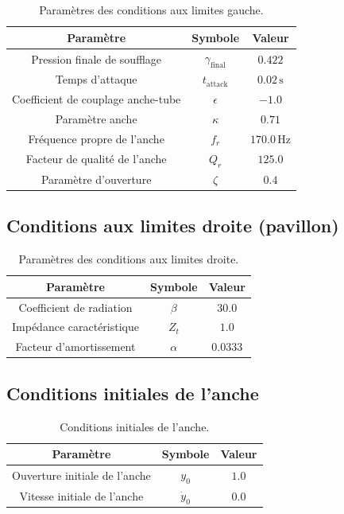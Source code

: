 \documentclass[12pt,a4paper]{article}
\begin{document}
\begin{table}[h!]
    \centering
    \begin{tabular}{|c|c|c|}
        \hline
        \textbf{Paramètre} & \textbf{Symbole} & \textbf{Valeur} \\
        \hline
        Pression finale de soufflage & $\gamma_{\text{final}}$ & $0.422$ \\
        \hline
        Temps d'attaque & $t_{\text{attack}}$ & $0.02 \, \text{s}$ \\
        \hline
        Coefficient de couplage anche-tube & $\epsilon$ & $-1.0$ \\
        \hline
        Paramètre anche & $\kappa$ & $0.71$ \\
        \hline
        Fréquence propre de l'anche & $f_r$ & $170.0 \, \text{Hz}$ \\
        \hline
        Facteur de qualité de l'anche & $Q_r$ & $125.0$ \\
        \hline
        Paramètre d'ouverture & $\zeta$ & $0.4$ \\
        \hline
    \end{tabular}
    \caption{Paramètres des conditions aux limites gauche.}
\end{table}

\newpage
\subsection{Conditions aux limites droite (pavillon)}

\begin{table}[h!]
    \centering
    \begin{tabular}{|c|c|c|}
        \hline
        \textbf{Paramètre} & \textbf{Symbole} & \textbf{Valeur} \\
        \hline
        Coefficient de radiation & $\beta$ & $30.0$ \\
        \hline
        Impédance caractéristique & $Z_t$ & $1.0$ \\
        \hline
        Facteur d'amortissement & $\alpha$ & $0.0333$ \\
        \hline
    \end{tabular}
    \caption{Paramètres des conditions aux limites droite.}
\end{table}

\subsection{Conditions initiales de l'anche}

\begin{table}[h!]
    \centering
    \begin{tabular}{|c|c|c|}
        \hline
        \textbf{Paramètre} & \textbf{Symbole} & \textbf{Valeur} \\
        \hline
        Ouverture initiale de l'anche & $y_0$ & $1.0$ \\
        \hline
        Vitesse initiale de l'anche & $\dot{y}_0$ & $0.0$ \\
        \hline
    \end{tabular}
    \caption{Conditions initiales de l'anche.}
\end{table}
\end{document}
